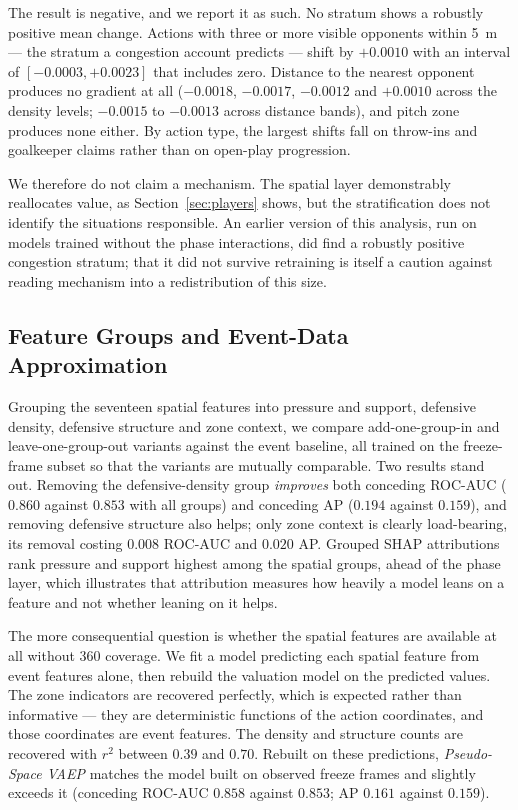 \documentclass[runningheads]{llncs}
\begin{document}
The result is negative, and we report it as such. No stratum shows a robustly positive mean change. Actions with three or more visible opponents within 5~m --- the stratum a congestion account predicts --- shift by $+0.0010$ with an interval of $[-0.0003, +0.0023]$ that includes zero. Distance to the nearest opponent produces no gradient at all ($-0.0018$, $-0.0017$, $-0.0012$ and $+0.0010$ across the density levels; $-0.0015$ to $-0.0013$ across distance bands), and pitch zone produces none either. By action type, the largest shifts fall on throw-ins and goalkeeper claims rather than on open-play progression.

We therefore do not claim a mechanism. The spatial layer demonstrably reallocates value, as Section~\ref{sec:players} shows, but the stratification does not identify the situations responsible. An earlier version of this analysis, run on models trained without the phase interactions, did find a robustly positive congestion stratum; that it did not survive retraining is itself a caution against reading mechanism into a redistribution of this size.

\subsection{Feature Groups and Event-Data Approximation}
\label{sec:groups}

Grouping the seventeen spatial features into pressure and support, defensive density, defensive structure and zone context, we compare add-one-group-in and leave-one-group-out variants against the event baseline, all trained on the freeze-frame subset so that the variants are mutually comparable. Two results stand out. Removing the defensive-density group \emph{improves} both conceding ROC-AUC ($0.860$ against $0.853$ with all groups) and conceding AP ($0.194$ against $0.159$), and removing defensive structure also helps; only zone context is clearly load-bearing, its removal costing $0.008$ ROC-AUC and $0.020$ AP. Grouped SHAP attributions rank pressure and support highest among the spatial groups, ahead of the phase layer, which illustrates that attribution measures how heavily a model leans on a feature and not whether leaning on it helps.

The more consequential question is whether the spatial features are available at all without 360 coverage. We fit a model predicting each spatial feature from event features alone, then rebuild the valuation model on the predicted values. The zone indicators are recovered perfectly, which is expected rather than informative --- they are deterministic functions of the action coordinates, and those coordinates are event features. The density and structure counts are recovered with $r^2$ between $0.39$ and $0.70$. Rebuilt on these predictions, \emph{Pseudo-Space VAEP} matches the model built on observed freeze frames and slightly exceeds it (conceding ROC-AUC $0.858$ against $0.853$; AP $0.161$ against $0.159$).
\end{document}
